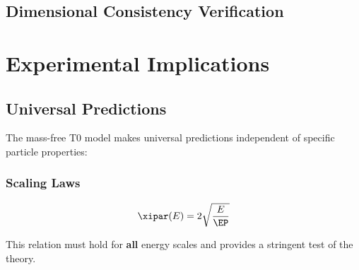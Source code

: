 	\subsection{Dimensional Consistency Verification}
	\label{subsec:dimensional_consistency}
	
	\begin{table}[htbp]
		\centering
		\caption{Dimensional Consistency of Mass-Free Formulations}
	\end{table}
	
	\section{Experimental Implications}
	\label{sec:experimental_implications}
	
	\subsection{Universal Predictions}
	\label{subsec:universal_predictions}
	
	The mass-free T0 model makes universal predictions independent of specific particle properties:
	
	\subsubsection{Scaling Laws}
	
	\begin{equation}
		\xipar(E) = 2\sqrt{\frac{E}{\EP}}
		\label{eq:universal_scaling}
	\end{equation}
	
	This relation must hold for \textbf{all} energy scales and provides a stringent test of the theory.
	
